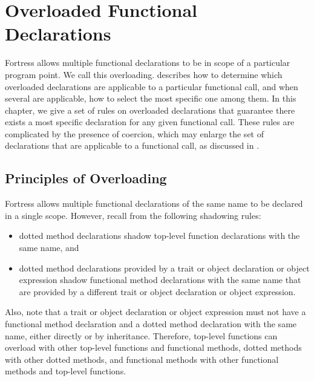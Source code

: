 %
%
%
%

\chapter{Overloaded Functional Declarations}


Fortress allows multiple functional declarations to be in scope of a
particular program point.  We call this overloading.
 describes
how to determine which overloaded declarations are
applicable to a particular functional call, and when several
are applicable, how to select the most specific one among them.
In this chapter, we give a
set of rules on overloaded declarations that guarantee there
exists a most specific declaration for any given functional call.
These rules are complicated by the presence of coercion, which may
enlarge the set of declarations that are applicable to a functional
call, as discussed in .



\section{Principles of Overloading}

Fortress allows multiple functional declarations of the same name to
be declared in a single scope.  However, recall from 
the following shadowing rules:
\begin{itemize}
\item
dotted method declarations shadow top-level function declarations with
the same name, and
\item
dotted method declarations provided by a trait or object declaration
or object expression
shadow functional method declarations with the same name that are
provided by a different trait or object declaration
or object expression.
\end{itemize}
Also, note that a trait or object declaration
or object expression must not have a
functional method declaration and a dotted method declaration with the
same name, either directly or by inheritance.
Therefore, top-level functions can overload
with other top-level functions and functional methods, dotted methods with
other dotted methods, and functional methods with other functional methods
and top-level functions.

